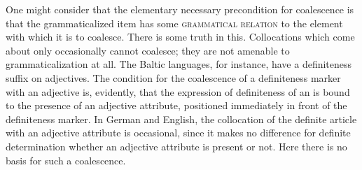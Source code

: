 One might consider that the elementary necessary precondition for coalescence is that the grammaticalized item has some \textsc{grammatical relation} to the element with which it is to coalesce. There is some truth in this. Collocations which come about only occasionally cannot coalesce; they are not amenable to grammaticalization at all. The Baltic languages, for instance, have a definiteness suffix on adjectives. The condition for the coalescence of a definiteness marker with an adjective is, evidently, that the expression of definiteness of an \np is bound to the presence of an adjective attribute, positioned immediately in front of the definiteness marker. In German and English, the collocation of the definite article with an adjective attribute is occasional, since it makes no difference for definite determination whether an adjective attribute is present or not. Here there is no basis for such a coalescence.

